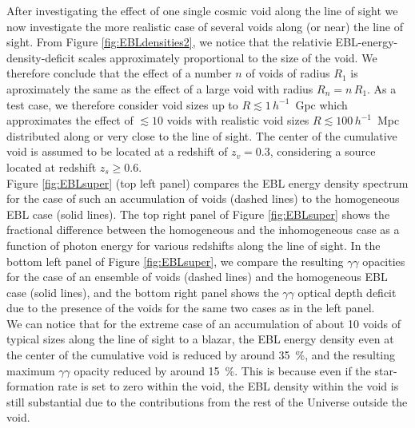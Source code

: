 \documentclass{aastex6}
\begin{document}
After investigating the effect of one single cosmic void along the line of sight we now investigate the 
more realistic case of several voids along (or near) the line of sight. From Figure \ref{fig:EBLdensities2}, 
we notice that the relativie EBL-energy-density-deficit scales approximately proportional to the size of 
the void. We therefore conclude that the effect of a number $n$ of voids of radius $R_1$ is aproximately 
the same as the effect of a large void with radius $R_n = n \, R_1$. As a test case, we therefore consider
void sizes up to $R \lesssim 1 \, h^{-1}$~Gpc which approximates the effect of $\lesssim 10$ voids with realistic 
void sizes $R \lesssim 100 \, h^{-1}$~Mpc distributed along or very close to the line of sight. The center of 
the cumulative void is assumed to be located at a redshift of $z_v = 0.3$, considering a source located at 
redshift $z_s \ge 0.6$.\\

Figure \ref{fig:EBLsuper} (top left panel) compares the EBL energy density spectrum for the case of such 
an accumulation of voids (dashed lines) to the homogeneous EBL case (solid lines). The top right panel of 
Figure \ref{fig:EBLsuper} shows the fractional difference between the homogeneous and the inhomogeneous 
case as a function of photon energy for various redshifts along the line of sight. In the bottom left panel 
of Figure \ref{fig:EBLsuper}, we compare the resulting $\gamma\gamma$ opacities for the case of an ensemble
of voids (dashed lines) and the homogeneous EBL case (solid lines), and the bottom right panel shows the 
$\gamma\gamma$ optical depth deficit due to the presence of the voids for the same two cases as in the 
left panel.
\\
We can notice that for the extreme case of an accumulation of about 10 voids of typical sizes along the line 
of sight to a blazar, the EBL energy density even at the center of the cumulative void is reduced by around 35~\%, 
and the resulting maximum $\gamma\gamma$ opacity reduced by around 15~\%. This is because even if the star-formation 
rate is set to zero within the void, the EBL density within the void is still substantial due to the contributions 
from the rest of the Universe outside the void. 
\end{document}
